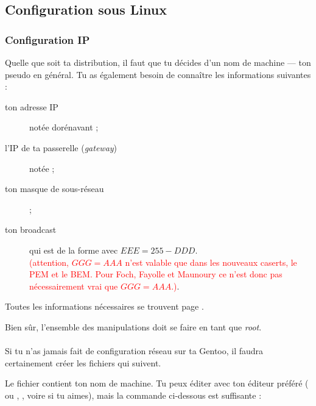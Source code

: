 
\clearpage
\pagebreak



\subsection{Configuration sous Linux}

\subsubsection{Configuration IP}
Quelle que soit ta distribution, il faut que tu d\'ecides d'un nom de
machine --- ton pseudo en g\'en\'eral. Tu as \'egalement besoin de
conna\^itre les informations suivantes :
\begin{description}
  \item [ton adresse IP] not\'ee dor\'enavant  ;
  \item [l'IP de ta passerelle (\emph{gateway})] not\'ee  ;
  \item [ton masque de sous-r\'eseau]  ;
  \item [ton broadcast] qui est de la forme  avec $EEE = 255 - DDD$. \\
        \textcolor{red}{(attention, $GGG = AAA$ n'est valable que dans les nouveaux caserts, le PEM et le BEM. Pour Foch, Fayolle et Maunoury ce n'est donc pas n\'ecessairement vrai que $GGG =
        AAA$.)}.
\end{description}

Toutes les informations n\'ecessaires se trouvent page
\pageref{calcul_ip}.

Bien s\^ur, l'ensemble des manipulations doit se faire en tant que \emph{root}.


\paragraph{}

Si tu n'as jamais fait de configuration r\'eseau sur ta Gentoo, il
faudra certainement cr\'eer les fichiers qui suivent.

Le fichier  contient ton nom de machine. Tu peux
\'editer  avec ton \'editeur pr\'ef\'er\'e ( ou
, , voire  si tu aimes), mais la
commande ci-dessous est suffisante :

